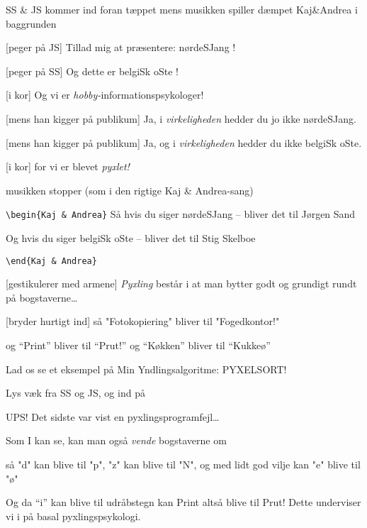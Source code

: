 \documentclass[danish]{article}
\begin{document}
\begin{sketch}

\scene SS \& JS kommer ind foran tæppet mens musikken spiller dæmpet
Kaj\&Andrea i baggrunden

[peger på JS] Tillad mig at præsentere: nørdeSJang !

[peger på SS] Og dette er belgiSk oSte !

[i kor] Og vi er \emph{hobby-}informationspsykologer! 

[mens han kigger på publikum] Ja, i \emph{virkeligheden}
hedder du jo ikke nørdeSJang.

[mens han kigger på publikum] Ja, og i \emph{virkeligheden}
  hedder du ikke belgiSk oSte.

[i kor] for vi er blevet \emph{pyxlet!}

\scene musikken stopper (som i den rigtige Kaj \& Andrea-sang)

\verb"\begin{Kaj & Andrea}"
 Så hvis du siger nørdeSJang -- bliver det til Jørgen Sand

 Og hvis du siger belgiSk oSte -- bliver det til
 Stig Skelboe

\verb"\end{Kaj & Andrea}"

[gestikulerer med armene] \emph{Pyxling} består i at man
bytter godt og grundigt rundt på bogstaverne\ldots

[bryder hurtigt ind] så "Fotokopiering" bliver til "Fogedkontor!"

 og ``Print'' bliver til ``Prut!'' og ``Køkken'' bliver til
``Kukkeø''

 Lad os se et eksempel på Min
Yndlingsalgoritme: PYXELSORT! 

\scene Lys væk fra SS og JS, og ind på 

 UPS! Det sidste var vist en pyxlingsprogramfejl\ldots

 Som I kan se, kan man også \emph{vende} bogstaverne om

 så "d" kan blive til "p", "z" kan blive til "N", og med lidt god
vilje kan "e" blive til "ø"

 Og da ``i'' kan blive til udråbstegn kan Print altså blive til
Prut! Dette underviser vi i på basal pyxlingspsykologi.


\end{sketch}
\end{document}
